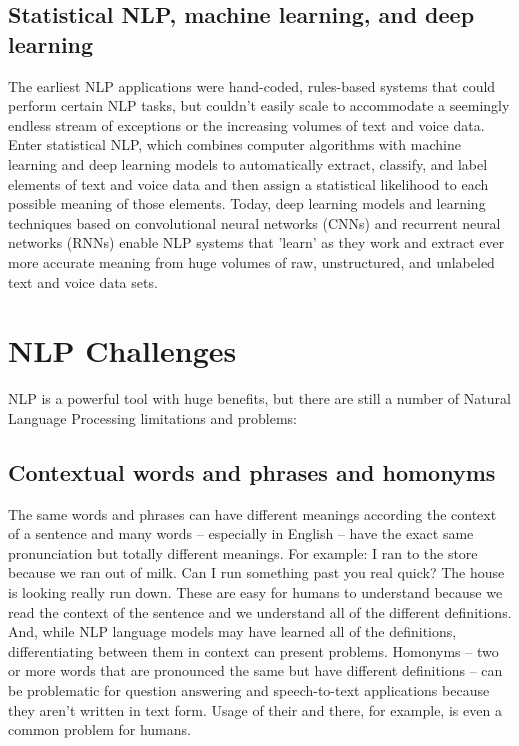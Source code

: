 \documentclass[11pt]{article}
\begin{document}
\subsection{Statistical NLP, machine learning, and deep learning}
\label{sec:orgc9f4a9e}
The earliest NLP applications were hand-coded, rules-based systems that could perform
certain NLP tasks, but couldn't easily scale to accommodate a seemingly endless stream
of exceptions or the increasing volumes of text and voice data.
Enter statistical NLP, which combines computer algorithms with machine learning and
deep learning models to automatically extract, classify, and label elements of text
and voice data and then assign a statistical likelihood to each possible meaning of
those elements. Today, deep learning models and learning techniques based on
convolutional neural networks (CNNs) and recurrent neural networks (RNNs) enable
NLP systems that 'learn' as they work and extract ever more accurate meaning from
huge volumes of raw, unstructured, and unlabeled text and voice data sets. 
\clearpage

\section{NLP Challenges}
\label{sec:orga028a95}
NLP is a powerful tool with huge benefits, but there are still a number of Natural
Language Processing limitations and problems:
\subsection{Contextual words and phrases and homonyms}
\label{sec:org83cace0}
The same words and phrases can have different meanings according the context of a sentence and many words – especially in English – have the exact same pronunciation but totally different meanings.
For example:
I ran to the store because we ran out of milk.
Can I run something past you real quick?
The house is looking really run down.
These are easy for humans to understand because we read the context of the sentence and we understand all of the different definitions. And, while NLP language models may have learned all of the definitions, differentiating between them in context can present problems.
Homonyms – two or more words that are pronounced the same but have different definitions – can be problematic for question answering and speech-to-text applications because they aren’t written in text form. Usage of their and there, for example, is even a common problem for humans.  
\end{document}
